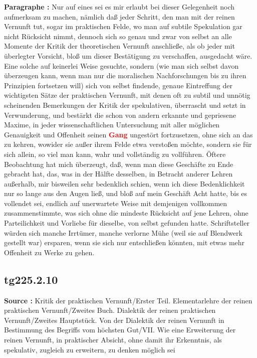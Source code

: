 \documentclass[a4paper,12pt,twoside]{book}
\newcommand{\match}[1]{\textcolor{red}{\textbf{#1}}}
\begin{document}
	\noindent\textbf{Paragraphe : }Nur auf eines sei es mir erlaubt bei dieser Gelegenheit noch aufmerksam zu machen, nämlich daß jeder Schritt, den man mit der reinen Vernunft tut, sogar im praktischen Felde, wo man auf subtile Spekulation gar nicht Rücksicht nimmt, dennoch sich so genau und zwar von selbst an alle Momente der Kritik der theoretischen Vernunft anschließe, als ob jeder mit überlegter Vorsicht, bloß um dieser Bestätigung zu verschaffen, ausgedacht wäre. Eine solche auf keinerlei Weise gesuchte, sondern (wie man sich selbst davon überzeugen kann, wenn man nur die moralischen Nachforschungen bis zu ihren Prinzipien fortsetzen will) sich von selbst findende, genaue Eintreffung der wichtigsten Sätze der praktischen Vernunft, mit denen oft zu subtil und unnötig scheinenden Bemerkungen der Kritik der spekulativen, überrascht und setzt in Verwunderung, und bestärkt die schon von andern erkannte und gepriesene Maxime, in jeder wissenschaftlichen Untersuchung mit aller möglichen Genauigkeit und Offenheit seinen \match{Gang} ungestört fortzusetzen,  ohne sich an das zu kehren, wowider sie außer ihrem Felde etwa verstoßen möchte, sondern sie für sich allein, so viel man kann, wahr und vollständig zu vollführen. Öftere Beobachtung hat mich überzeugt, daß, wenn man diese Geschäfte zu Ende gebracht hat, das, was in der Hälfte desselben, in Betracht anderer Lehren außerhalb, mir bisweilen sehr bedenklich schien, wenn ich diese Bedenklichkeit nur so lange aus den Augen ließ, und bloß auf mein Geschäft Acht hatte, bis es vollendet sei, endlich auf unerwartete Weise mit demjenigen vollkommen zusammenstimmte, was sich ohne die mindeste Rücksicht auf jene Lehren, ohne Parteilichkeit und Vorliebe für dieselbe, von selbst gefunden hatte. Schriftsteller würden sich manche Irrtümer, manche verlorne Mühe (weil sie auf Blendwerk gestellt war) ersparen, wenn sie sich nur entschließen könnten, mit etwas mehr Offenheit zu Werke zu gehen. 
	
	\subsection*{tg225.2.10} 
	\textbf{Source : }Kritik der praktischen Vernunft/Erster Teil. Elementarlehre der reinen praktischen Vernunft/Zweites Buch. Dialektik der reinen praktischen Vernunft/Zweites Hauptstück. Von der Dialektik der reinen Vernunft in Bestimmung des Begriffs vom höchsten Gut/VII. Wie eine Erweiterung der reinen Vernunft, in praktischer Absicht, ohne damit ihr Erkenntnis, als spekulativ, zugleich zu erweitern, zu denken möglich sei\\  
	
\end{document}

